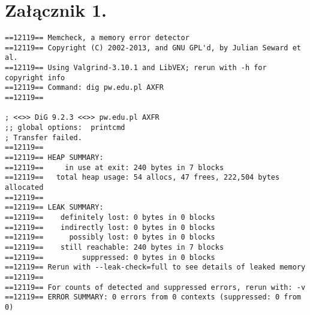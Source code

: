 \newpage\section*{Załącznik 1.}
\begin{lstlisting}
==12119== Memcheck, a memory error detector
==12119== Copyright (C) 2002-2013, and GNU GPL'd, by Julian Seward et al.
==12119== Using Valgrind-3.10.1 and LibVEX; rerun with -h for copyright info
==12119== Command: dig pw.edu.pl AXFR
==12119== 

; <<>> DiG 9.2.3 <<>> pw.edu.pl AXFR
;; global options:  printcmd
; Transfer failed.
==12119== 
==12119== HEAP SUMMARY:
==12119==     in use at exit: 240 bytes in 7 blocks
==12119==   total heap usage: 54 allocs, 47 frees, 222,504 bytes allocated
==12119== 
==12119== LEAK SUMMARY:
==12119==    definitely lost: 0 bytes in 0 blocks
==12119==    indirectly lost: 0 bytes in 0 blocks
==12119==      possibly lost: 0 bytes in 0 blocks
==12119==    still reachable: 240 bytes in 7 blocks
==12119==         suppressed: 0 bytes in 0 blocks
==12119== Rerun with --leak-check=full to see details of leaked memory
==12119== 
==12119== For counts of detected and suppressed errors, rerun with: -v
==12119== ERROR SUMMARY: 0 errors from 0 contexts (suppressed: 0 from 0)
\end{lstlisting}
